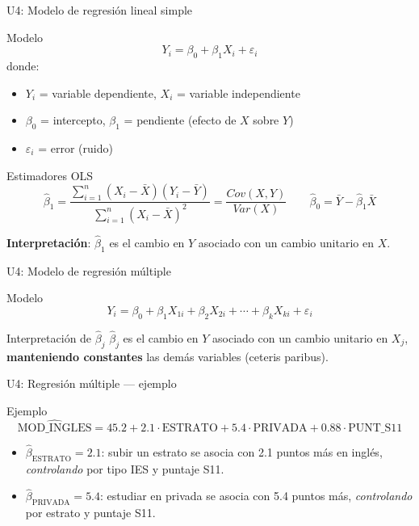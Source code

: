 \documentclass[aspectratio=169, 11pt]{beamer}
\begin{document}
\begin{frame}{U4: Modelo de regresión lineal simple}
\begin{block}{Modelo}
$$Y_i = \beta_0 + \beta_1 X_i + \varepsilon_i$$
donde:
\begin{itemize}
\item $Y_i$ = variable dependiente, $X_i$ = variable independiente
\item $\beta_0$ = intercepto, $\beta_1$ = pendiente (efecto de $X$ sobre $Y$)
\item $\varepsilon_i$ = error (ruido)
\end{itemize}
\end{block}

\begin{block}{Estimadores OLS}
$$\hat{\beta}_1 = \frac{\sum_{i=1}^{n}(X_i - \bar{X})(Y_i - \bar{Y})}{\sum_{i=1}^{n}(X_i - \bar{X})^2} = \frac{Cov(X, Y)}{Var(X)} \qquad \hat{\beta}_0 = \bar{Y} - \hat{\beta}_1 \bar{X}$$
\end{block}

\small
\textbf{Interpretaci\'on}: $\hat{\beta}_1$ es el cambio en $Y$ asociado con un cambio unitario en $X$.
\end{frame}

\begin{frame}{U4: Modelo de regresi\'on m\'ultiple}
\begin{block}{Modelo}
$$Y_i = \beta_0 + \beta_1 X_{1i} + \beta_2 X_{2i} + \cdots + \beta_k X_{ki} + \varepsilon_i$$
\end{block}

\begin{block}{Interpretación de $\hat{\beta}_j$}
$\hat{\beta}_j$ es el cambio en $Y$ asociado con un cambio unitario en $X_j$, \textbf{manteniendo constantes} las demás variables (ceteris paribus).
\end{block}
\end{frame}

\begin{frame}{U4: Regresión múltiple --- ejemplo}
\begin{exampleblock}{Ejemplo}
$$\widehat{\text{MOD\_INGLES}} = 45.2 + 2.1 \cdot \text{ESTRATO} + 5.4 \cdot \text{PRIVADA} + 0.88 \cdot \text{PUNT\_S11}$$
\begin{itemize}
\item $\hat{\beta}_{\text{ESTRATO}} = 2.1$: subir un estrato se asocia con 2.1 puntos más en inglés, \textit{controlando} por tipo IES y puntaje S11.
\item $\hat{\beta}_{\text{PRIVADA}} = 5.4$: estudiar en privada se asocia con 5.4 puntos más, \textit{controlando} por estrato y puntaje S11.
\end{itemize}
\end{exampleblock}
\end{frame}
\end{document}
